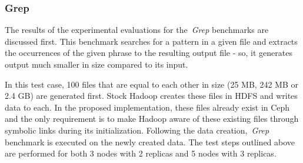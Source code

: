 \documentclass[preprint,12pt]{elsarticle}
\begin{document}
\begin{table}[!htbp]
 \begin{center}
 \end{center}
 \caption{Test Parameters}
 \label{testparams}
\end{table}

\subsubsection{Grep}
\label{greptest}
The results of the experimental evaluations for the~\textit{Grep} benchmarks are discussed first.
This benchmark searches for a pattern in a given file and extracts the occurrences
of the given phrase to the resulting output file - so, it generates output much smaller
in size compared to its input.

In this test case, 100 files that are equal to each other in size (25 MB, 242 MB or 2.4 GB)
are generated first. Stock Hadoop creates these files in HDFS and writes data to each.
In the proposed implementation, these files already exist in Ceph and the only requirement
is to make Hadoop aware of these existing files through symbolic links during its initialization. 
Following the data creation,~\textit{Grep} benchmark is executed on the newly created data.
The test steps outlined above are performed for both 3 nodes with 2 replicas and 5 nodes with
3 replicas.
\end{document}

